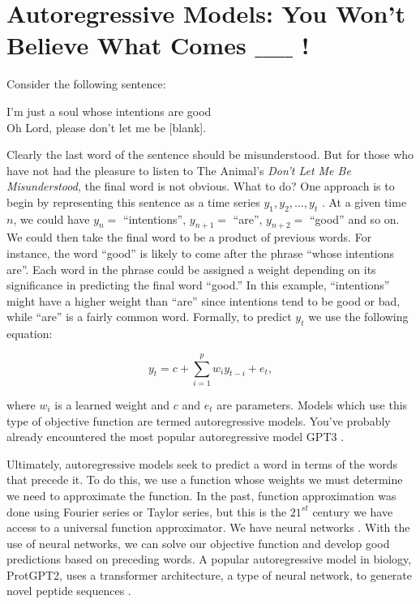 \documentclass{SBCbookchapter}
\begin{document}
\newpage

\section{Autoregressive Models: You Won't Believe What Comes ${\_}{\_}{\_}{\_}{\_}$ !}

\medskip

Consider the following sentence:

\begin{center}
    I’m just a soul whose intentions are good \\ 
    Oh Lord, please don’t let me be [blank].
\end{center}

Clearly the last word of the sentence should be misunderstood. But for those who have not had the pleasure to listen to The Animal’s \textit{Don’t Let Me Be Misunderstood}, the final word is not 
obvious. What to do? One approach is to begin by representing this sentence as a time series $y_1, y_2, …, y_t$ \cite{triebe_ar-net_2019}. At a given time $n$, we could have $y_n =$ ``intentions'', 
$y_{n+1} =$ ``are'', $y_{n+2} =$ ``good'' and so on. We could then take the final word to be a product of previous words. For instance, the word ``good'' is likely to come after the phrase ``whose 
intentions are''. Each word in the phrase could be assigned a weight depending on its significance in predicting the final word ``good.'' In this example, ``intentions'' might have a higher weight than 
``are'' since intentions tend to be good or bad, while ``are'' is a fairly common word. Formally, to predict $y_t$ we use the following equation:

\begin{equation*}
    y_t = c + \sum_{i=1}^{p} w_iy_{t-i} + e_t,
\end{equation*}

\noindent where $w_i$ is a learned weight and $c$ and $e_t$ are parameters. Models which use this type of objective function are termed autoregressive models. You’ve probably already encountered the 
most popular autoregressive model \textemdash GPT3 \cite{he_masked_2022}. 

Ultimately, autoregressive models seek to predict a word in terms of the words that precede it. To do this, we use a function whose weights we must determine \textemdash we need to approximate the 
function. In the past, function approximation was done using Fourier series or Taylor series, but this is the $21^{st}$ century \textemdash we have access to a universal function approximator. We have 
neural networks \cite{hornik_multilayer_1989}. With the use of neural networks, we can solve our objective function and develop good predictions based on preceding words. A popular autoregressive model 
in biology, ProtGPT2, uses a transformer architecture, a type of neural network, to generate novel peptide sequences \cite{ferruz_protgpt2_2022}. 
\end{document}
